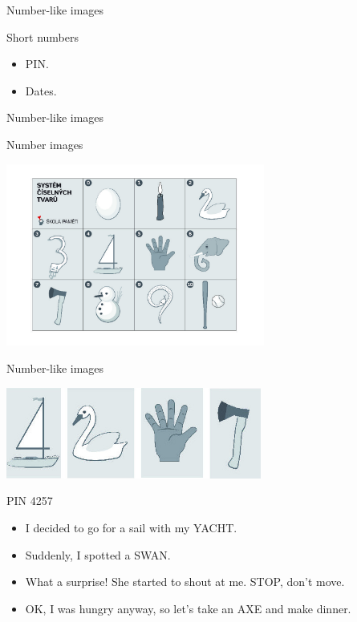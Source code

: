\begin{frame}{Number-like images}
  \begin{block}{Short numbers}
    \begin{itemize}
      \item PIN.
      \item Dates. 
    \end{itemize}
  \end{block}
\end{frame}

\begin{frame}{Number-like images}
  \begin{block}{Number images}
    \begin{center}
      \includegraphics[height=6cm]{img/numbers.jpg}
    \end{center}
  \end{block}
\end{frame}

\begin{frame}{Number-like images}
  \begin{center}
    \includegraphics[height=3cm]{img/pin.jpg}
  \end{center}
  \begin{block}{PIN 4257}
    \begin{itemize}
      \item I decided to go for a sail with my YACHT. 
      \item Suddenly, I spotted a SWAN. 
      \item What a surprise! She started to shout at me. STOP, don't move. 
      \item OK, I was hungry anyway, so let's take an AXE and make dinner. 
    \end{itemize}
  \end{block}
\end{frame}

